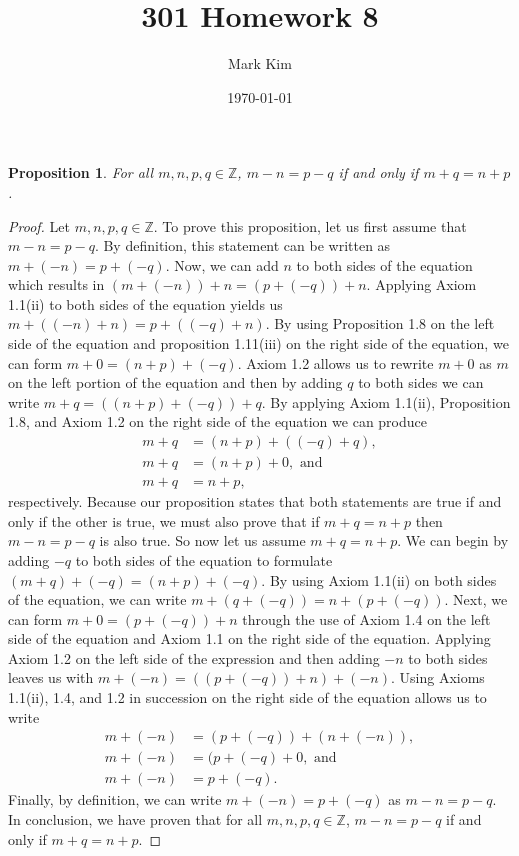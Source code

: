 \documentclass[12pt]{amsart}
\title{301 Homework 8}
\author{Mark Kim}
\date{\today}
\newcommand{\Z}{\mathbb{Z}}
\newtheorem*{proposition}{Proposition}
\begin{document}
\maketitle

\begin{proposition}
For all $m,n,p,q\in\Z$, $m-n=p-q$ if and only if $m+q=n+p$.
\end{proposition}

\begin{proof}
Let $m,n,p,q\in\Z$. To prove this proposition, let us first assume that $m-n=p-q$.  By definition, this statement can be written as $m+(-n)=p+(-q)$.  Now, we can add $n$ to both sides of the equation which results in $(m+(-n))+n =(p+(-q))+n$.  Applying Axiom 1.1(ii) to both sides of the equation yields us $m+((-n)+n)=p+((-q)+n)$.  By using Proposition 1.8 on the left side of the equation and proposition 1.11(iii) on the right side of the equation, we can form $m+0=(n+p)+(-q)$.  Axiom 1.2 allows us to rewrite $m+0$ as $m$ on the left portion of the equation and then by adding $q$ to both sides we can write $m+q=((n+p)+(-q))+q$.  By applying Axiom 1.1(ii), Proposition 1.8, and Axiom 1.2 on the right side of the equation we can produce
\begin{align*}
m+q&=(n+p)+((-q)+q),\\
m+q&=(n+p)+0,\text{ and}\\
m+q&=n+p,
\end{align*}
respectively.  Because our proposition states that both statements are true if and only if the other is true, we must also prove that if $m+q=n+p$ then $m-n=p-q$ is also true.  So now let us assume $m+q=n+p$.  We can begin by adding $-q$ to both sides of the equation to formulate $(m+q)+(-q)=(n+p)+(-q)$.  By using Axiom 1.1(ii) on both sides of the equation, we can write $m+(q+(-q))=n+(p+(-q))$.  Next, we can form $m+0=(p+(-q))+n$ through the use of Axiom 1.4 on the left side of the equation and Axiom 1.1 on the right side of the equation.  Applying Axiom 1.2 on the left side of the expression and then adding $-n$ to both sides leaves us with $m+(-n)=((p+(-q))+n)+(-n)$.  Using Axioms 1.1(ii), 1.4, and 1.2 in succession on the right side of the equation allows us to write
\begin{align*}
m+(-n)&=(p+(-q))+(n+(-n)),\\
m+(-n)&=(p+(-q)+0,\text{ and}\\
m+(-n)&=p+(-q).
\end{align*}
Finally, by definition, we can write $m+(-n)=p+(-q)$ as $m-n=p-q$.  In conclusion, we have proven that for all $m,n,p,q\in\Z$, $m-n=p-q$ if and only if $m+q=n+p$.
\end{proof}
\end{document}
